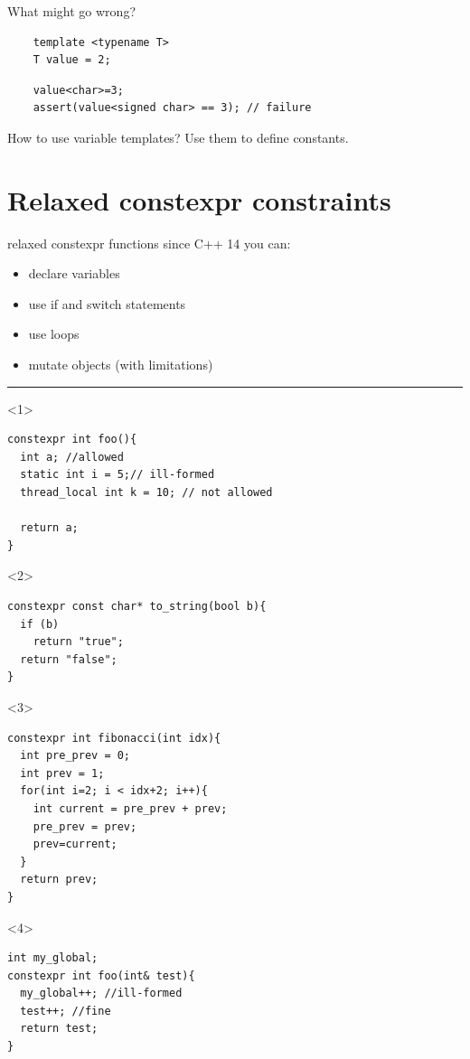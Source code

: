 \documentclass[10pt]{beamer}
\begin{document}
\begin{frame}[fragile]{What might go wrong?}
	\begin{verbatim}
	template <typename T>
	T value = 2;
	\end{verbatim}

	\pause

	\begin{verbatim}
	value<char>=3;
	assert(value<signed char> == 3); // failure
	\end{verbatim}
\end{frame}

\begin{frame}{How to use variable templates?}
\vfill
	\centering \alert{Use them to define constants.}
\vfill
\end{frame}


\section{Relaxed constexpr constraints}
\begin{frame}[fragile]{relaxed constexpr functions}
	since C++ 14 you can:
	\begin{itemize}[<+- |alert@+>]
		\item declare variables
		\item use if and switch statements
		\item use loops
		\item mutate objects (with limitations)
	\end{itemize}
	\hrule
	\vfill

	\begin{onlyenv}
	\begin{verbatim}
constexpr int foo(){
  int a; //allowed
  static int i = 5;// ill-formed
  thread_local int k = 10; // not allowed

  return a;
}
	\end{verbatim}
	\end{onlyenv}

	\begin{onlyenv}
	\begin{verbatim}
constexpr const char* to_string(bool b){
  if (b)
    return "true";
  return "false";
}
	\end{verbatim}
	\end{onlyenv}

	\begin{onlyenv}
	\begin{verbatim}
constexpr int fibonacci(int idx){
  int pre_prev = 0;
  int prev = 1;
  for(int i=2; i < idx+2; i++){
    int current = pre_prev + prev;
    pre_prev = prev;
    prev=current;
  }
  return prev;
}
\end{verbatim}
	\end{onlyenv}

	\begin{onlyenv}
	\begin{verbatim}
int my_global;	
constexpr int foo(int& test){
  my_global++; //ill-formed
  test++; //fine
  return test;
}
\end{verbatim}
	\end{onlyenv}

\end{frame}
\end{document}
